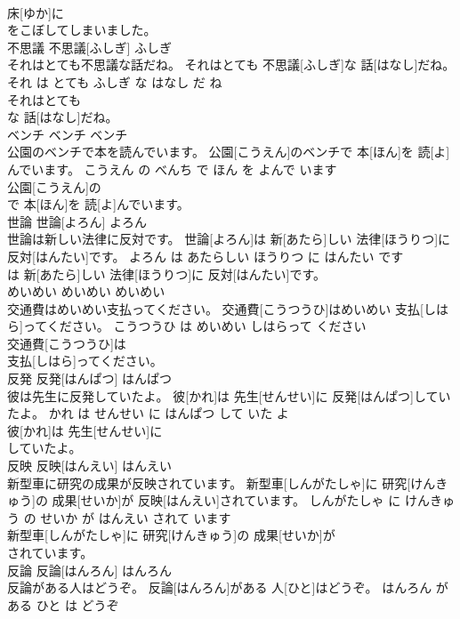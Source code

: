 \documentclass[8pt]{extreport}
\begin{document}
\begin{CJK}{UTF8}{min}
\\	床[ゆか]に
\\	をこぼしてしまいました。			
\\	不思議	不思議[ふしぎ]	ふしぎ	
\\	それはとても不思議な話だね。	それはとても 不思議[ふしぎ]な 話[はなし]だね。	それ は とても ふしぎ な はなし だ ね	
\\	それはとても
\\	な 話[はなし]だね。			
\\	ベンチ	ベンチ	ベンチ	
\\	公園のベンチで本を読んでいます。	公園[こうえん]のベンチで 本[ほん]を 読[よ]んでいます。	こうえん の べんち で ほん を よんで います	
\\	公園[こうえん]の
\\	で 本[ほん]を 読[よ]んでいます。			
\\	世論	世論[よろん]	よろん	
\\	世論は新しい法律に反対です。	世論[よろん]は 新[あたら]しい 法律[ほうりつ]に 反対[はんたい]です。	よろん は あたらしい ほうりつ に はんたい です	
\\	は 新[あたら]しい 法律[ほうりつ]に 反対[はんたい]です。			
\\	めいめい	めいめい	めいめい	
\\	交通費はめいめい支払ってください。	交通費[こうつうひ]はめいめい 支払[しはら]ってください。	こうつうひ は めいめい しはらって ください	
\\	交通費[こうつうひ]は
\\	支払[しはら]ってください。			
\\	反発	反発[はんぱつ]	はんぱつ	
\\	彼は先生に反発していたよ。	彼[かれ]は 先生[せんせい]に 反発[はんぱつ]していたよ。	かれ は せんせい に はんぱつ して いた よ	
\\	彼[かれ]は 先生[せんせい]に
\\	していたよ。			
\\	反映	反映[はんえい]	はんえい	
\\	新型車に研究の成果が反映されています。	新型車[しんがたしゃ]に 研究[けんきゅう]の 成果[せいか]が 反映[はんえい]されています。	しんがたしゃ に けんきゅう の せいか が はんえい されて います	
\\	新型車[しんがたしゃ]に 研究[けんきゅう]の 成果[せいか]が
\\	されています。			
\\	反論	反論[はんろん]	はんろん	
\\	反論がある人はどうぞ。	反論[はんろん]がある 人[ひと]はどうぞ。	はんろん が ある ひと は どうぞ	

\end{CJK}
\end{document}
